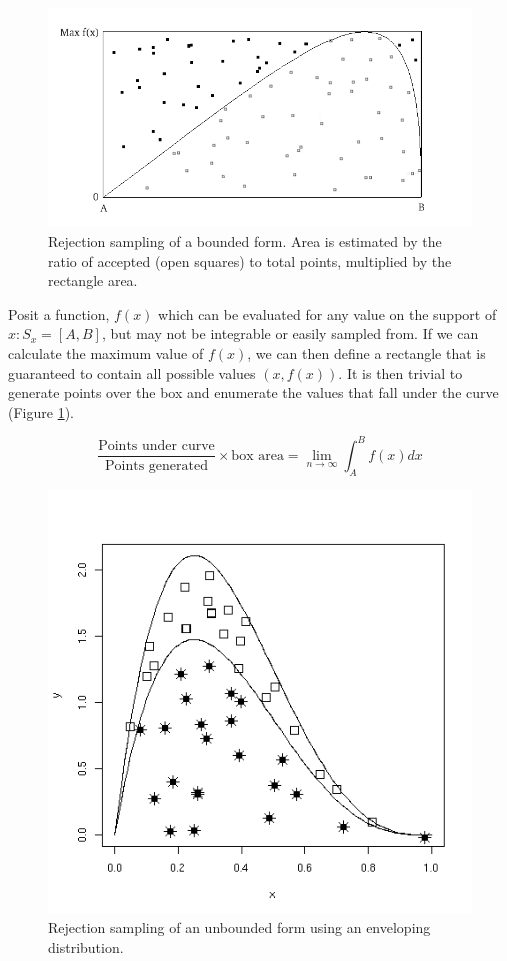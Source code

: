 \documentclass[]{book}
\begin{document}
\begin{figure}[ht]
        \begin{center}
        \includegraphics[scale=0.4]{reject.png}
    \end{center}
    \caption{Rejection sampling of a bounded form. Area is estimated by the ratio of accepted (open squares) to total points, multiplied by the rectangle area.}
    \label{fig:bound}
\end{figure}

Posit a function, $f(x)$ which can be evaluated for any value on the support of $x:S_x = [A,B]$, but may not be integrable or easily sampled from. If we can calculate the maximum  value of $f(x)$, we can then define a rectangle that is guaranteed to contain all possible values $(x,f(x))$. It is then trivial to generate points over the box and enumerate the values that fall under the curve (Figure \ref{fig:bound}).

\[
\frac{\mbox{Points under curve}}{\mbox{Points generated}} \times \mbox{box area} = \lim_{n \to \infty} \int_A^B f(x) dx
\]

\begin{figure}[h]
        \begin{center}
        \includegraphics[scale=0.4]{envelope.png}
    \end{center}
    \caption{Rejection sampling of an unbounded form using an enveloping distribution.}
    \label{fig:unbound}
\end{figure}
\end{document}
